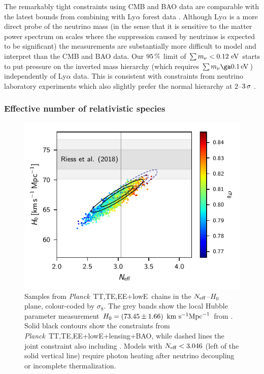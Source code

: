 \documentclass[longauth,traditabstract]{aa}
\def\Planck{\textit{Planck}}
\def\,{\thinspace}
\newcommand{\mksym}[1]{\ifmmode {\rm #1}\else #1\fi}
\newcommand{\dataplus}{\allowbreak+}
\newcommand{\TTTEEE}{\mksym{TT,TE,EE}}
\newcommand{\planckTTTEEEonly}{\planck\ \TTTEEE}
\newcommand{\lowE}{\mksym{lowE}}
\newcommand{\planckall}{\planckTTTEEEonly\dataplus\lowE}
\newcommand{\nnu}{N_{\rm eff}}
\newcommand{\neff}{\nnu}
\newcommand{\sumnu}{\sum m_\nu}
\providecommand{\text}[1]{\rm{#1}}
\newcommand{\Mpc}{\text{Mpc}}
\newcommand{\Hunit}{~\text{km}~\text{s}^{-1} \Mpc^{-1}}
\newcommand{\eV}{\,\text{eV}}
\newcommand{\planck}{\Planck}
\begin{document}
The remarkably tight constraints using CMB and BAO data are comparable with the latest bounds from combining with Ly\,$\alpha$ forest data \citep{Palanque-Delabrouille:2015pga,Yeche:2017upn}. Although Ly\,$\alpha$ is a more direct probe of the neutrino mass (in the sense that it is sensitive to the matter power spectrum on scales where the suppression caused by neutrinos is expected to be significant)
the measurements are substantially more difficult to model and interpret than the CMB and BAO data.
Our $95\,\%$ limit of $\sumnu < 0.12\,\eV$ starts to put pressure on the inverted mass hierarchy (which requires $\sumnu\ga 0.1\eV$)
independently of Ly\,$\alpha$ data. This is consistent with constraints from neutrino laboratory experiments which also slightly prefer the normal hierarchy at $2$--$3\,\sigma$ \citep{Adamson:2017gxd,Abe:2017aap,Capozzi:2018ubv,deSalas:2017kay,deSalas:2018bym}.


\subsubsection{Effective number of relativistic species}

\begin{figure}[htbp!]
\centering
\includegraphics[]{nnu-H0-sigma8.pdf}
\caption{Samples from \planckall\ chains in the
$\neff$--$H_0$ plane, colour-coded by $\sigma_8$.  The grey bands show the
local Hubble parameter measurement $H_0=(73.45\pm 1.66)\,\Hunit$ from \citet{Riess18}.
Solid black contours show the constraints from \planckall+lensing+BAO,
while dashed lines the joint constraint also including \citet{Riess18}.
Models with $\neff < 3.046$ (left of the solid vertical line) require photon
heating after neutrino decoupling or incomplete thermalization.
\label{fig:nnu-H-sigma}
}
\end{figure}
\end{document}

